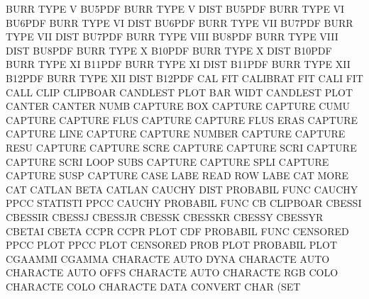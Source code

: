BURR     TYPE V                         BU5PDF
BURR     TYPE V    DIST                 BU5PDF
BURR     TYPE VI                        BU6PDF
BURR     TYPE VI   DIST                 BU6PDF
BURR     TYPE VII                       BU7PDF
BURR     TYPE VII  DIST                 BU7PDF
BURR     TYPE VIII                      BU8PDF
BURR     TYPE VIII DIST                 BU8PDF
BURR     TYPE X                         B10PDF
BURR     TYPE X    DIST                 B10PDF
BURR     TYPE XI                        B11PDF
BURR     TYPE XI   DIST                 B11PDF
BURR     TYPE XII                       B12PDF
BURR     TYPE XII  DIST                 B12PDF
CAL                                     FIT
CALIBRAT                                FIT
CALI                                    FIT
CALL     CLIP                           CLIPBOAR
CANDLEST PLOT BAR WIDT                  CANDLEST PLOT
CANTER                                  CANTER   NUMB
CAPTURE  BOX                            CAPTURE
CAPTURE  CUMU                           CAPTURE
CAPTURE  FLUS                           CAPTURE
CAPTURE  FLUS ERAS                      CAPTURE
CAPTURE  LINE                           CAPTURE
CAPTURE  NUMBER                         CAPTURE
CAPTURE  RESU                           CAPTURE
CAPTURE  SCRE                           CAPTURE
CAPTURE  SCRI                           CAPTURE
CAPTURE  SCRI LOOP SUBS                 CAPTURE
CAPTURE  SPLI                           CAPTURE
CAPTURE  SUSP                           CAPTURE
CASE     LABE                           READ     ROW  LABE
CAT      MORE                           CAT
CATLAN   BETA                           CATLAN
CAUCHY   DIST                           PROBABIL FUNC
CAUCHY   PPCC                           STATISTI PPCC
CAUCHY                                  PROBABIL FUNC
CB                                      CLIPBOAR
CBESSI                                  CBESSIR
CBESSJ                                  CBESSJR
CBESSK                                  CBESSKR
CBESSY                                  CBESSYR
CBETAI                                  CBETA
CCPR                                    CCPR     PLOT
CDF                                     PROBABIL FUNC
CENSORED PPCC PLOT                      PPCC     PLOT
CENSORED PROB PLOT                      PROBABIL PLOT
CGAAMMI                                 CGAMMA
CHARACTE AUTO DYNA                      CHARACTE AUTO
CHARACTE AUTO OFFS                      CHARACTE AUTO
CHARACTE RGB  COLO                      CHARACTE COLO
CHARACTE DATA                           CONVERT  CHAR (SET
